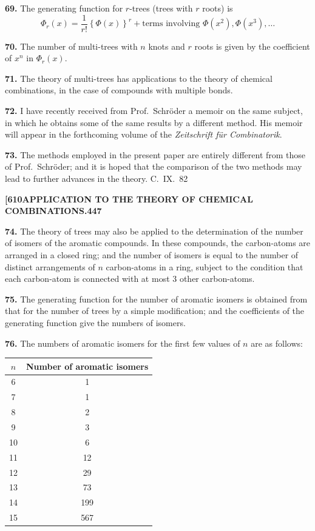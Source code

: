 \documentclass[11pt,a4paper]{article}
\begin{document}
{\medskip
\noindent\textbf{69.}
The generating function for $r$-trees (trees with $r$ roots) is
\[
\Phi_r(x) = \frac{1}{r!} \left\{\Phi(x)\right\}^r + \text{terms involving } \Phi(x^2), \Phi(x^3), \ldots
\]

\medskip
\noindent\textbf{70.}
The number of multi-trees with $n$ knots and $r$ roots is given by the coefficient of $x^n$ in $\Phi_r(x)$.

\medskip
\noindent\textbf{71.}
The theory of multi-trees has applications to the theory of chemical combinations, in the case of compounds with multiple bonds.

\medskip
\noindent\textbf{72.}
I have recently received from Prof.~Schr\"{o}der a memoir on the same subject, in which he obtains some of the same results by a different method. His memoir will appear in the forthcoming volume of the \textit{Zeitschrift f\"{u}r Combinatorik}.

\medskip
\noindent\textbf{73.}
The methods employed in the present paper are entirely different from those of Prof.~Schr\"{o}der; and it is hoped that the comparison of the two methods may lead to further advances in the theory.
\hfill C.~IX.\ 82

\newpage
\noindent\textbf{[610}\hspace{\fill}\textbf{APPLICATION TO THE THEORY OF CHEMICAL COMBINATIONS.}\hspace{\fill}\textbf{447}

\noindent\textbf{74.}
The theory of trees may also be applied to the determination of the number of isomers of the aromatic compounds. In these compounds, the carbon-atoms are arranged in a closed ring; and the number of isomers is equal to the number of distinct arrangements of $n$ carbon-atoms in a ring, subject to the condition that each carbon-atom is connected with at most 3 other carbon-atoms.

\medskip
\noindent\textbf{75.}
The generating function for the number of aromatic isomers is obtained from that for the number of trees by a simple modification; and the coefficients of the generating function give the numbers of isomers.

\medskip
\noindent\textbf{76.}
The numbers of aromatic isomers for the first few values of $n$ are as follows:

\begin{center}
\begin{tabular}{|c|c|}
\hline
$n$ & Number of aromatic isomers \\
\hline
6 & 1 \\
7 & 1 \\
8 & 2 \\
9 & 3 \\
10 & 6 \\
11 & 12 \\
12 & 29 \\
13 & 73 \\
14 & 199 \\
15 & 567 \\
\hline
\end{tabular}
\end{center}

}
\end{document}
